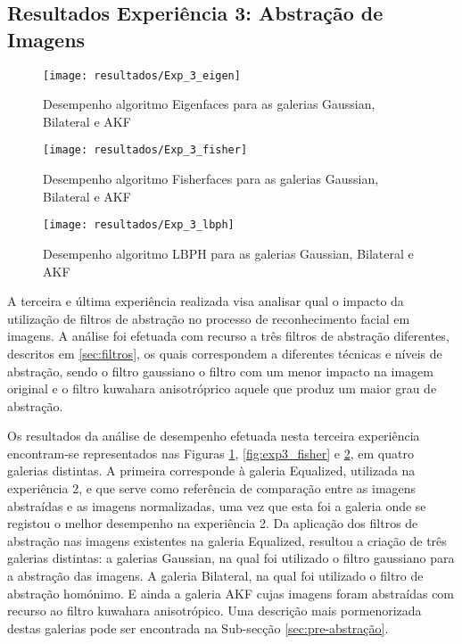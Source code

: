 \subsection{Resultados Experiência 3: Abstração de Imagens} \label{sub:exp3}
        \begin{figure}[ht]
                \centering
                \texttt{[image: resultados/Exp\_3\_eigen]}
                \caption{Desempenho algoritmo Eigenfaces para as galerias Gaussian, Bilateral e AKF}
                \label{fig:exp3_eigen}
        \end{figure}%

        \begin{figure}[p]
                \centering
                \texttt{[image: resultados/Exp\_3\_fisher]}
                \caption{Desempenho algoritmo Fisherfaces para as galerias Gaussian, Bilateral e AKF}
                \label{fig:exp3_fisher}
                \centering
                \texttt{[image: resultados/Exp\_3\_lbph]}
                \caption{Desempenho algoritmo LBPH para as galerias Gaussian, Bilateral e AKF}
                \label{fig:exp3_lbph}                
        \end{figure}%
A terceira e última experiência realizada visa analisar qual o impacto da utilização de filtros de abstração no processo de reconhecimento facial em imagens. A análise foi efetuada com recurso a três filtros de abstração diferentes, descritos em \ref{sec:filtros}, os quais correspondem a diferentes técnicas e níveis de abstração, sendo o filtro gaussiano o filtro com um menor impacto na imagem original e o filtro kuwahara anisotróprico aquele que produz um maior grau de abstração. 

Os resultados da análise de desempenho efetuada nesta terceira experiência encontram-se representados nas Figuras \ref{fig:exp3_eigen}, \ref{fig:exp3_fisher} e \ref{fig:exp3_lbph}, em quatro galerias distintas. A primeira corresponde à galeria Equalized, utilizada na experiência 2, e que serve como referência de comparação entre as imagens abstraídas e as imagens normalizadas, uma vez que esta foi a galeria onde se registou o melhor desempenho na experiência 2. Da aplicação dos filtros de abstração nas imagens existentes na galeria Equalized, resultou a criação de três galerias distintas: a galerias Gaussian, na qual foi utilizado o filtro gaussiano para a abstração das imagens. A galeria Bilateral, na qual foi utilizado o filtro de abstração homónimo. E ainda a galeria AKF cujas imagens foram abstraídas com recurso ao filtro kuwahara anisotrópico. Uma descrição mais pormenorizada destas galerias pode ser encontrada na Sub-secção \ref{sec:pre-abstração}.

